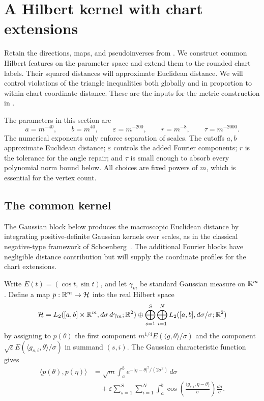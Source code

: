 \section{A Hilbert kernel with chart extensions}
\label{ker:sec}

Retain the directions, maps, and pseudoinverses from
. We construct common Hilbert features on the parameter
space and extend them to the rounded chart labels. Their squared distances
will approximate Euclidean distance. We will control violations of the
triangle inequalities both globally and in proportion to within-chart
coordinate distance. These are the inputs for the metric construction in
.

The parameters in this section are
\begin{equation}
\label{ker:parameters}
 a=m^{-40},\qquad b=m^{40},\qquad
 \varepsilon=m^{-200},\qquad r=m^{-8},\qquad \tau=m^{-2000}.
\end{equation}
The numerical exponents only enforce separation of scales. The cutoffs
$a,b$ approximate Euclidean distance; $\varepsilon$ controls the added
Fourier components; $r$ is the tolerance for the angle repair; and $\tau$
is small enough to absorb every polynomial norm bound below. All choices
are fixed powers of $m$, which is essential for the vertex count.

\subsection{The common kernel}

The Gaussian block below produces the macroscopic Euclidean distance
by integrating positive-definite Gaussian kernels over scales, as in the
classical negative-type framework of Schoenberg~\cite{Sch38}.
The additional Fourier blocks have negligible distance contribution but
will supply the coordinate profiles for the chart extensions.

Write $E(t)=(\cos t,\sin t)$, and let $\gamma_m$ be standard Gaussian measure
on $\mathbb R^m$.  Define a map $p:\mathbb R^m\to\mathcal H$ into the real Hilbert space
\[
 \mathcal H=
 L_2([a,b]\times\mathbb R^m,d\sigma\,d\gamma_m;\mathbb R^2)
 \mathbin{\oplus}
 \bigoplus_{s=1}^{S}\bigoplus_{i=1}^{N}
 L_2([a,b],d\sigma/\sigma;\mathbb R^2)
\]
by assigning to $p(\theta)$ the first component
$m^{1/4}E(\langle g,\theta\rangle/\sigma)$ and the component
$\sqrt\varepsilon E(\langle g_{s,i},\theta\rangle/\sigma)$ in summand
$(s,i)$.  The Gaussian characteristic function gives
\begin{equation}
\label{eq:kernel}
\begin{split}
 \langle p(\theta),p(\eta)\rangle
 &=\sqrt m\int_a^b
     e^{-|\eta-\theta|^2/(2\sigma^2)}\,d\sigma\\
 &\quad+\varepsilon\sum_{s=1}^{S}\sum_{i=1}^{N}
   \int_a^b
   \cos\!\left(\frac{\langle g_{s,i},\eta-\theta\rangle}{\sigma}\right)
   \frac{d\sigma}{\sigma}.
\end{split}
\end{equation}

